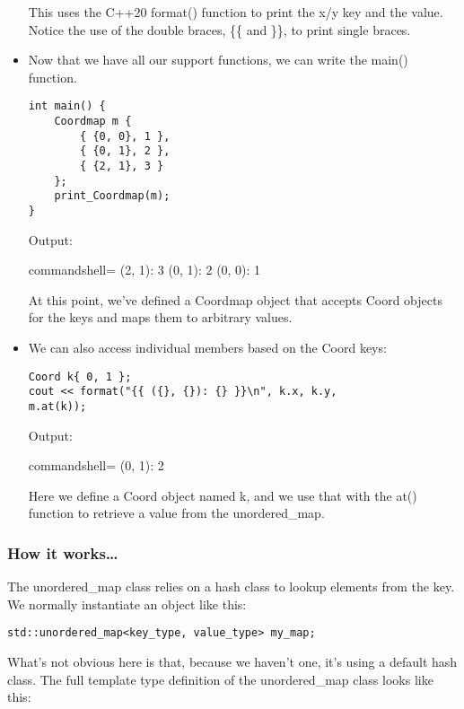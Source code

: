 \begin{itemize}
This uses the C++20 format() function to print the x/y key and the value.
Notice the use of the double braces, \{\{ and \}\}, to print single braces.

\item 
Now that we have all our support functions, we can write the main() function.

\begin{lstlisting}[style=styleCXX]
int main() {
	Coordmap m {
		{ {0, 0}, 1 },
		{ {0, 1}, 2 },
		{ {2, 1}, 3 }
	};
	print_Coordmap(m);
}
\end{lstlisting}

Output:

\begin{tcblisting}{commandshell={}}
{ (2, 1): 3 } { (0, 1): 2 } { (0, 0): 1 }
\end{tcblisting}

At this point, we've defined a Coordmap object that accepts Coord objects for the keys and maps them to arbitrary values.

\item 
We can also access individual members based on the Coord keys:

\begin{lstlisting}[style=styleCXX]
Coord k{ 0, 1 };
cout << format("{{ ({}, {}): {} }}\n", k.x, k.y,
m.at(k));
\end{lstlisting}

Output:

\begin{tcblisting}{commandshell={}}
{ (0, 1): 2 }
\end{tcblisting}

Here we define a Coord object named k, and we use that with the at() function to retrieve a value from the unordered\_map.

\end{itemize}

\subsubsection{How it works…}

The unordered\_map class relies on a hash class to lookup elements from the key.
We normally instantiate an object like this:

\begin{lstlisting}[style=styleCXX]
std::unordered_map<key_type, value_type> my_map;
\end{lstlisting}

What's not obvious here is that, because we haven't one, it's using a default hash class. The full template type definition of the unordered\_map class looks like this:

